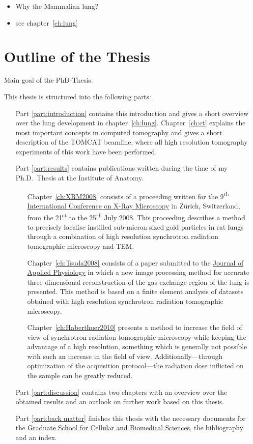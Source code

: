 \begin{itemize}
	\item Why the Mammalian lung?
	\item see chapter~\ref{ch:lung}
\end{itemize}

\section{Outline of the Thesis}
Main goal of the PhD-Thesis.

This thesis is structured into the following parts:

\begin{itemize}
	\item [Part \ref{part:introduction}] contains this introduction and gives a short overview over the lung development in chapter~\ref{ch:lung}. Chapter~\ref{ch:ct} explains the most important concepts in computed tomography and gives a short description of the \acf{TOMCAT} beamline, where all high resolution tomography experiments of this work have been performed.

	\item [Part \ref{part:results}] contains publications written during the time of my Ph.D.\ Thesis at the Institute of Anatomy.

	\begin{itemize}
		\item [Chapter~\ref{ch:XRM2008}] consists of a proceeding written for the 9\textsuperscript{th} \href{http://xrm2008.web.psi.ch/}{International Conference on X-Ray Microscopy} in Zürich, Switzerland, from the 21\textsuperscript{st} to the 25\textsuperscript{th} July 2008. This proceeding describes a method to precisely localise instilled sub-micron sized gold particles in rat lungs through a combination of high resolution synchrotron radiation tomographic microscopy and \acl{TEM}.
		\item [Chapter~\ref{ch:Tsuda2008}] consists of a paper submitted to the \href{http://jap.physiology.org/}{Journal of Applied Physiology} in which a new image processing method for accurate three dimensional reconstruction of the gas exchange region of the lung is presented. This method is based on a finite element analysis of datasets obtained with high resolution synchrotron radiation tomographic microscopy.
		\item [Chapter~\ref{ch:Haberthuer2010}] presents a method to increase the field of view of synchrotron radiation tomographic microscopy while keeping the advantage of a high resolution, something which is generally not possible with such an increase in the field of view. Additionally---through optimization of the acquisition protocol---the radiation dose inflicted on the sample can be greatly reduced.
	\end{itemize}
	\item [Part \ref{part:discussion}] contains two chapters with an overview over the obtained results and an outlook on further work based on this thesis.

	\item [Part \ref{part:back matter}] finishes this thesis with the necessary documents for the \href{http://www.gcb.unibe.ch}{Graduate School for Cellular and Biomedical Sciences}, the bibliography and an index.
\end{itemize}